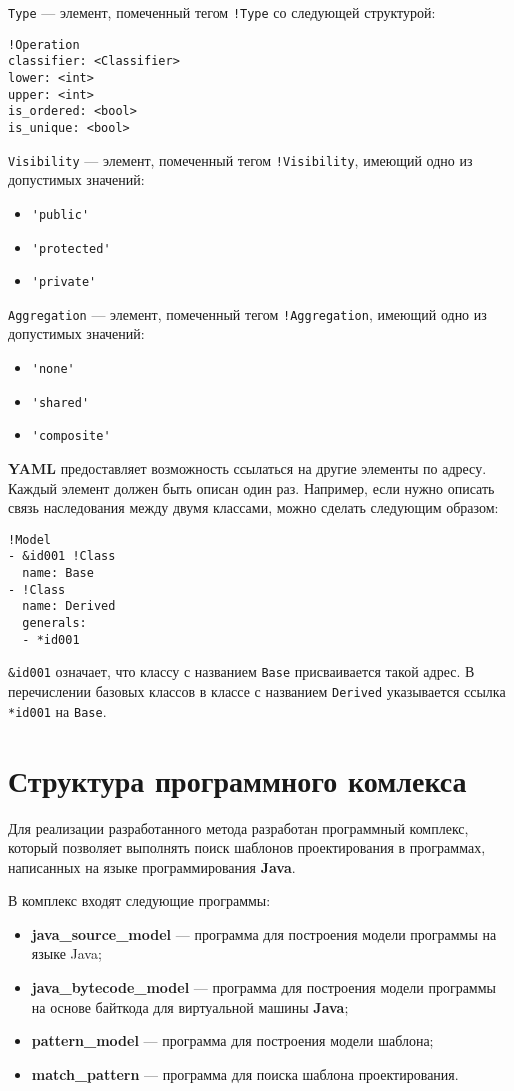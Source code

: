 \verb;Type; --- элемент, помеченный тегом \verb;!Type; со следующей
структурой:
\begin{verbatim}
!Operation
classifier: <Classifier>
lower: <int>
upper: <int>
is_ordered: <bool>
is_unique: <bool>
\end{verbatim}

\verb;Visibility; --- элемент, помеченный тегом \verb;!Visibility;,
имеющий одно из допустимых значений:
\begin{itemize}
\item \verb;'public';
\item \verb;'protected';
\item \verb;'private';
\end{itemize}

\verb;Aggregation; --- элемент, помеченный тегом \verb;!Aggregation;,
имеющий одно из допустимых значений:
\begin{itemize}
\item \verb;'none';
\item \verb;'shared';
\item \verb;'composite';
\end{itemize}

\textbf{YAML} предоставляет возможность ссылаться на другие элементы по адресу.
Каждый элемент должен быть описан один раз.
Например, если нужно описать связь наследования между двумя классами, можно
сделать следующим образом:
\begin{verbatim}
!Model
- &id001 !Class
  name: Base
- !Class
  name: Derived
  generals:
  - *id001
\end{verbatim}

\verb;&id001; означает, что классу с названием \verb;Base; присваивается такой
адрес. В перечислении базовых классов в классе с названием \verb;Derived;
указывается ссылка \verb;*id001; на \verb;Base;.

\section{Структура программного комлекса}

Для реализации разработанного метода разработан программный комплекс,
который позволяет выполнять поиск шаблонов проектирования в программах,
написанных на языке программирования \textbf{Java}.

В комплекс входят следующие программы:
\begin{itemize}
\item \textbf{java\_source\_model} --- программа для построения модели программы
на языке Java;
\item \textbf{java\_bytecode\_model} --- программа для построения модели программы
на основе байткода для виртуальной машины \textbf{Java};
\item \textbf{pattern\_model} --- программа для построения модели шаблона;
\item \textbf{match\_pattern} --- программа для поиска шаблона проектирования.
\end{itemize}

